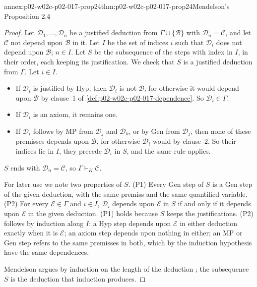 \begin{annexitem}{annex:p02-w02c-p02-017-prop24}{thm:p02-w02c-p02-017-prop24}{Mendelson's Proposition 2.4}
\begin{proof}
Let \(\mathscr D_1,\ldots,\mathscr D_n\) be a justified deduction from
\(\Gamma\cup\{\mathscr B\}\) with \(\mathscr D_n=\mathscr C\), and let
\(\mathscr C\) not depend upon \(\mathscr B\) in it.  Let \(I\) be the set of
indices \(i\) such that \(\mathscr D_i\) does not depend upon \(\mathscr B\);
\(n\in I\).  Let \(S\) be the subsequence of the steps with index in \(I\), in
their order, each keeping its justification.  We check that \(S\) is a
justified deduction from \(\Gamma\).  Let \(i\in I\).
\begin{itemize}
  \item If \(\mathscr D_i\) is justified by Hyp, then \(\mathscr D_i\) is not
        \(\mathscr B\), for otherwise it would depend upon \(\mathscr B\) by
        clause~1 of \cref{def:p02-w02c-p02-017-dependence}.  So
        \(\mathscr D_i\in\Gamma\).
  \item If \(\mathscr D_i\) is an axiom, it remains one.
  \item If \(\mathscr D_i\) follows by MP from \(\mathscr D_j\) and
        \(\mathscr D_k\), or by Gen from \(\mathscr D_j\), then none of these
        premisses depends upon \(\mathscr B\), for otherwise \(\mathscr D_i\)
        would by clause~2.  So their indices lie in \(I\), they precede
        \(\mathscr D_i\) in \(S\), and the same rule applies.
\end{itemize}
\(S\) ends with \(\mathscr D_n=\mathscr C\), so \(\Gamma\vdash_K\mathscr C\).

For later use we note two properties of \(S\).  (P1) Every Gen step of
\(S\) is a Gen step of the given deduction, with the same premiss and the same
quantified variable.  (P2) For every \(\mathscr E\in\Gamma\) and
\(i\in I\), \(\mathscr D_i\) depends upon \(\mathscr E\) in \(S\) if and only
if it depends upon \(\mathscr E\) in the given deduction.  (P1) holds because
\(S\) keeps the justifications.  (P2) follows by induction along \(I\): a Hyp
step depends upon \(\mathscr E\) in either deduction exactly when it is
\(\mathscr E\); an axiom step depends upon nothing in either; an MP or Gen
step refers to the same premisses in both, which by the induction hypothesis
have the same dependences.

Mendelson argues by induction on the length of the deduction
\cite[\S 2.4, p.~74]{Mendelson1997}; the subsequence \(S\) is the deduction
that induction produces.
\end{proof}
\end{annexitem}

